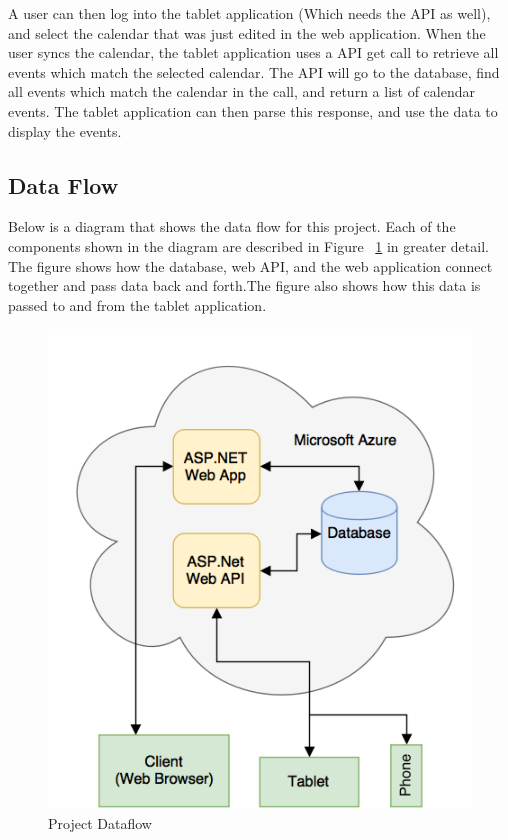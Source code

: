 A user can then log into the tablet application (Which needs the API as well), and select the calendar that was just edited in the web application.  When the user syncs the calendar, the tablet application uses a API get call to retrieve all events which match the selected calendar.  The API will go to the database, find all events which match the calendar in the call, and return a list of calendar events.  The tablet application can then parse this response, and use the data to display the events.
 
\subsection{Data Flow}
Below is a diagram that shows the data flow for this project. Each of the components shown in the diagram are described in Figure ~\ref{overallDataflow} in greater detail. The figure shows how the database, web API, and the web application connect together and pass data back and forth.The figure also shows how this data is passed to and from the tablet application.
 
\begin{figure}[h!]
\centering
\includegraphics[scale=0.5]{DesignImages/OverallDataFlow.png}
\caption{Project Dataflow}
\label{overallDataflow}
\end{figure} 
 
